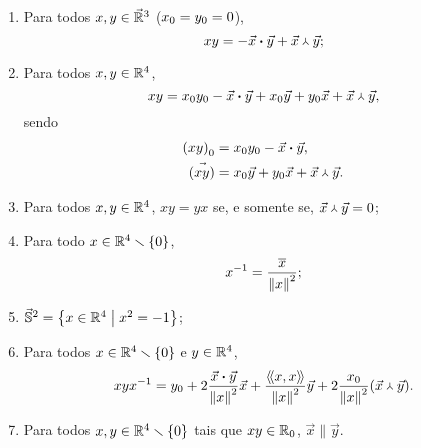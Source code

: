 \begin{proposition}
	\begin{enumerate}
	\item Para todos $x,y \in \vec{\mathbb{R}}^3$ (${x}_0 = {y}_0 = 0$),
		\begin{equation*}
		xy = - {\vec{x}} \bm{\cdot} {\vec{y}} + {\vec{x}} \Yup {\vec{y}};
		\end{equation*}
	\item Para todos $x,y \in \mathbb{R}^4$,
		\begin{equation*}
		xy = {x}_0{y}_0 - {\vec{x}} \bm{\cdot} {\vec{y}} + {x}_0\vec{y} + {y}_0\vec{x} + {\vec{x}} \Yup {\vec{y}},
		\end{equation*}
sendo
		\begin{align*}	
		{(xy)}_0 &= {x}_0{y}_0 - {\vec{x}} \bm{\cdot} {\vec{y}}, \\
		\vec{(xy)} &= {x}_0\vec{y} + {y}_0\vec{x} + {\vec{x}} \Yup {\vec{y}}.
		\end{align*}
	
	\item Para todos $x,y \in \mathbb{R}^4$, $xy=yx$ se, e somente se, ${\vec{x}} \Yup {\vec{y}}=0$;%
	
	\item Para todo $x \in \mathbb{R}^4 \smallsetminus \{0\}$,
		\begin{equation*}
		x^{-1} = \frac{\overline{x}}{\left\Vert{x}\right\Vert^2};
		\end{equation*}
	
	\item $\vec{\mathbb{S}}^2 = \left\{{x \in \mathbb{R}^4}\;\middle\vert\;{x^2 = -1}\right\}$;

	\item Para todos $x \in \mathbb{R}^4 \smallsetminus \{0\}$ e $y \in \mathbb{R}^4$,
		\begin{equation*}
		xyx^{-1} = {y}_0 + 2\frac{{\vec{x}} \bm{\cdot} {\vec{y}}}{\left\Vert{x}\right\Vert^2}\vec{x} + \frac{\left\langle\!\left\langle{x},{x}\right\rangle\!\right\rangle}{\left\Vert{x}\right\Vert^2}\vec{y} + 2\frac{{x}_0}{\left\Vert{x}\right\Vert^2}({\vec{x}} \Yup {\vec{y}}).
		\end{equation*}

	\item Para todos $x,y \in \mathbb{R}^4 \smallsetminus \{0\}$ tais que $xy \in {\mathbb{R}}_0$, %
	 $\vec{x} \parallel \vec{y}$.
	\end{enumerate}
\end{proposition}
